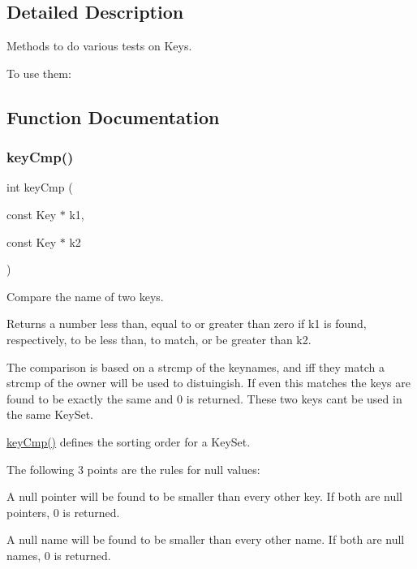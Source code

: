 \subsection{Detailed Description}
Methods to do various tests on Keys. 

To use them\+: 
\begin{DoxyCode}{0}
\DoxyCodeLine{\textcolor{preprocessor}{\#include <kdb.h>}}
\end{DoxyCode}
 

\subsection{Function Documentation}
\mbox{\label{group__keytest_gaf6e66e12fe04d535a5d1c8218ced803e}} 
\subsubsection{\texorpdfstring{keyCmp()}{keyCmp()}}
{\footnotesize\ttfamily int key\+Cmp (\begin{DoxyParamCaption}\item[{const Key $\ast$}]{k1,  }\item[{const Key $\ast$}]{k2 }\end{DoxyParamCaption})}



Compare the name of two keys. 

\begin{DoxyReturn}{Returns}
a number less than, equal to or greater than zero if k1 is found, respectively, to be less than, to match, or be greater than k2.
\end{DoxyReturn}
The comparison is based on a strcmp of the keynames, and iff they match a strcmp of the owner will be used to distuingish. If even this matches the keys are found to be exactly the same and 0 is returned. These two keys can\textquotesingle{}t be used in the same Key\+Set.

\mbox{\hyperlink{group__keytest_gaf6e66e12fe04d535a5d1c8218ced803e}{key\+Cmp()}} defines the sorting order for a Key\+Set.

The following 3 points are the rules for null values\+:


\begin{DoxyItemize}
\item A null pointer will be found to be smaller than every other key. If both are null pointers, 0 is returned.
\item A null name will be found to be smaller than every other name. If both are null names, 0 is returned.
\end{DoxyItemize}


